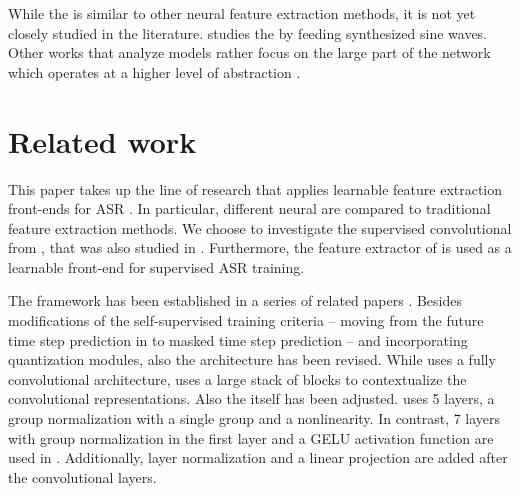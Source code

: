 \documentclass{INTERSPEECH2023}
\begin{document}
While the \wvtwo \fe is similar to other neural feature extraction methods, it is not yet closely studied in the literature.
\cite{choi2022w2v2fe} studies the \fe by feeding synthesized sine waves.
Other works that analyze \wvtwo models rather focus on the large \transformer part of the network which operates at a higher level of abstraction \cite{livescu2021wav2vec_analysis, fan21wvspeakerid, li2023exploration, dieck2022wav2vec}.


\section{Related work}
This paper takes up the line of research that applies learnable feature extraction front-ends for \gls{ASR} \cite{palaz2015convolutional, golik15:cnn, tuske2018:waveform, ravanelli2018sincnet, sainath2015cldnn}.
In particular, different neural \fes are compared to traditional feature extraction methods.
We choose to investigate the supervised convolutional \fe from \cite{tuske2018:waveform}, that was also studied in \cite{vieting2021waveform}.
Furthermore, the feature extractor of \wvtwo \cite{facebook2020wav2vec2} is used as a learnable front-end for supervised \gls{ASR} training.

The \wv framework has been established in a series of related papers \cite{facebook2019wav2vec, facebook2019vqwav2vec, facebook2020wav2vec2, facebook2020xlsr}.
Besides modifications of the self-supervised training criteria -- moving from the future time step prediction in \cite{facebook2019wav2vec} to masked time step prediction -- and incorporating quantization modules, also the architecture has been revised.
While \cite{facebook2019wav2vec} uses a fully convolutional architecture, \cite{facebook2020wav2vec2} uses a large stack of \transformer blocks to contextualize the convolutional representations.
%
Also the \fe itself has been adjusted.
\cite{facebook2019wav2vec} uses 5 layers, a group normalization with a single group and a \relu nonlinearity.
In contrast, 7 layers with group normalization in the first layer and a GELU activation function are used in \cite{facebook2020wav2vec2}.
Additionally, layer normalization and a linear projection are added after the convolutional layers.
\end{document}
